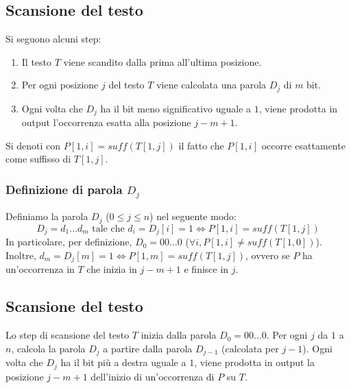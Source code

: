 \subsection{Scansione del testo}
Si seguono alcuni step:
\begin{enumerate}
    \item Il testo $T$ viene scandito dalla prima all’ultima posizione.
    \item Per ogni posizione $j$ del testo $T$ viene calcolata una parola $D_j$ di $m$ bit.
    \item Ogni volta che $D_j$ ha il bit meno significativo uguale a $1$, viene prodotta in output l’occorrenza esatta alla posizione $j-m+1$.
\end{enumerate}
Si denoti con $P[1, i] = suff(T[1, j])$ il fatto che $P[1,i]$ occorre esattamente come suffisso di $T[1,j]$.

\subsubsection{Definizione di parola \texorpdfstring{$D_j$}{}} 
Definiamo la parola $D_j$ ($0 \leq j \leq n$) nel seguente modo:
\[D_j = d_1 \dots d_m \mbox{ tale che } d_i = D_j[i] = 1 \iff P[1, i] = suff(T[1, j])\]
In particolare, per definizione, $D_0 = 00\dots 0$ ($\forall i, P[1,i] \neq suff(T[1,0])$).
Inoltre, $d_m = D_j[m] = 1 \iff P[1,m] = suff(T[1,j])$, ovvero se $P$ ha un’occorrenza in $T$ che inizia in $j-m+1$ e finisce in $j$.

\subsection{Scansione del testo}
Lo step di scansione del testo $T$ inizia dalla parola $D_0 = 00\dots0$. Per ogni $j$ da $1$ a $n$, calcola la parola $D_j$ a partire dalla parola $D_{j-1}$ (calcolata per $j-1$). Ogni volta che $D_j$ ha il bit più a destra uguale a $1$, viene prodotta in output la posizione $j-m+1$ dell’inizio di un’occorrenza di $P$ su $T$.

